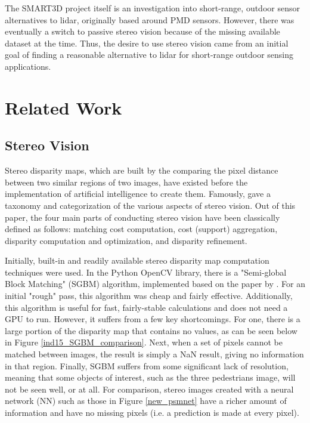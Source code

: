 The SMART3D project itself is an investigation into short-range, outdoor sensor alternatives to lidar, originally based around PMD sensors. However, there was eventually a switch to passive stereo vision because of the missing available dataset at the time. Thus, the desire to use stereo vision came from an initial goal of finding a reasonable alternative to lidar for short-range outdoor sensing applications. 

\newpage
\section{Related Work} %

\subsection{Stereo Vision}
Stereo disparity maps, which are built by the comparing the pixel distance between two similar regions of two images, have existed before the implementation of artificial intelligence to create them. Famously, \cite{scharstein_taxonomy_2002} gave a taxonomy and categorization of the various aspects of stereo vision. Out of this paper, the four main parts of conducting stereo vision have been classically defined as follows: matching cost computation, cost (support) aggregation, disparity computation and optimization, and disparity refinement. 

Initially, built-in and readily available stereo disparity map computation techniques were used. In the Python OpenCV library, there is a "Semi-global Block Matching" (SGBM) algorithm, implemented based on the paper by \cite{hirschmuller2007stereo}. For an initial "rough" pass, this algorithm was cheap and fairly effective. Additionally, this algorithm is useful for fast, fairly-stable calculations and does not need a GPU to run. However, it suffers from a few key shortcomings. For one, there is a large portion of the disparity map that contains no values, as can be seen below in Figure \ref{ind15_SGBM_comparison}. Next, when a set of pixels cannot be matched between images, the result is simply a NaN result, giving no information in that region. Finally, SGBM suffers from some significant lack of resolution, meaning that some objects of interest, such as the three pedestrians image, will not be seen well, or at all. For comparison, stereo images created with a neural network (NN) such as those in Figure \ref{new_psmnet} have a richer amount of information and have no missing pixels (i.e. a prediction is made at every pixel). 

